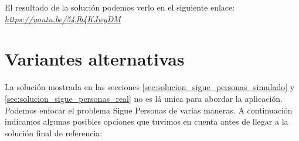 El resultado de la solución podemos verlo en el siguiente enlace:\\
\textit{\url{https://youtu.be/54Jb4KJwyDM}}\\



\section{Variantes alternativas}
\label{sec:variantes_solucion}

La solución mostrada en las secciones \ref{sec:solucion_sigue_personas_simulado} y \ref{sec:solucion_sigue_personas_real} no es lá unica para abordar la aplicación. Podemos enfocar el problema Sigue Personas de varias maneras. A continuación indicamos algunas posibles opciones que tuvimos en cuenta antes de llegar a la solución final de referencia:\\

